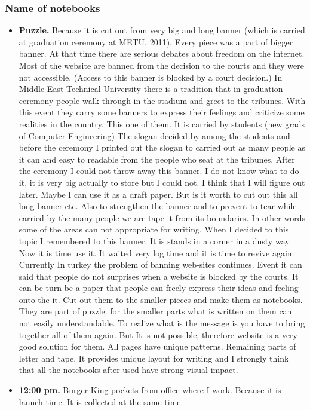 \subsubsection{Name of notebooks}
\begin{itemize}
\item \textbf{Puzzle.} Because it is cut out from very big and long banner (which is carried at graduation ceremony at METU, 2011). Every piece was a part of bigger banner. At that time there are serious debates about freedom on the internet. Most of the website are banned from the decision to the courts and they were not accessible. (Access to this banner is blocked by a court decision.) In Middle East Technical University there is a tradition that in graduation ceremony people walk through in the stadium and greet to the tribunes. With this event they carry some banners to express their feelings and criticize some realities in the country. This one of them. It is carried by students (new grads of Computer Engineering) The slogan decided by among the students and before the ceremony I printed out the slogan to carried out as many people as it can and easy to readable from the people who seat at the tribunes. After the ceremony I could not throw away this banner. I do not know what to do it, it is very big actually to store but I could not. I think that I will figure out later. Maybe I can use it as a draft paper. But is it worth to cut out this all long banner etc. Also to strengthen the banner and to prevent to tear while carried by the many people we are tape it from its boundaries. In other words some of the areas can not appropriate for writing. When I decided to this topic I remembered to this banner. It is stands in a corner in a dusty way. Now it is time use it. It waited very log time and it is time to revive again. Currently In turkey the problem of banning web-sites continues. Event it can said that people do not surprises when a website is blocked by the courts. It can be turn be a paper that people can freely express their ideas and feeling onto the it. Cut out them to the smaller pieces and make them as notebooks. They are part of puzzle. for the smaller parts what is written on them can not easily understandable. To realize what is the message is you have to bring together all of them again. But It is not possible, therefore website is a very good solution for them. All pages have unique patterns. Remaining parts of letter and tape. It provides unique layout for writing and I strongly think that all the notebooks after used have strong visual impact. 
\item \textbf{12:00 pm.} Burger King pockets from office where I work. Because it is launch time. It is collected at the same time.

\end{itemize}
